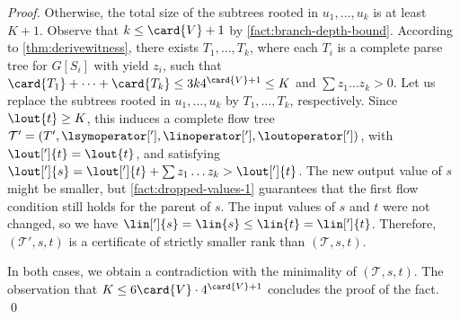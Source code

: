 \begin{proof}
  Otherwise,
  the total size of the subtrees rooted in $u_1, \ldots, u_k$ is
  at least $K + 1$.
  Observe that $k \leq \card{V} + 1$ by \cref{fact:branch-depth-bound}.
  According to \cref{thm:derivewitness},
  there exists $T_1, \ldots, T_k$,
  where each $T_i$ is a complete parse tree for $G[S_i]$ with
  yield $z_i$,
  such that $\card{T_1} + \cdots + \card{T_k} \leq 3 k 4^{\card{V}+1} \leq K$
  and $\sum z_1\ldots z_k>0$.
  Let us replace the subtrees rooted in $u_1, \ldots, u_k$
  by $T_1, \ldots, T_k$, respectively.
  Since $\lout{t} \geq K$,
  this induces a complete flow tree
  $\mathcal{T}' = (T', \lsymoperator['], \linoperator['], \loutoperator['])$,
  with $\lout[']{t} = \lout{t}$, and
  satisfying
  $\lout[']{s} = \lout[']{t} + \sum z_1\ldots z_k > \lout[']{t}$.
  The new output value of $s$ might be smaller,
  but \cref{fact:dropped-values-1} guarantees that the first flow condition
  still holds for the parent of $s$.
  The input values of $s$ and $t$ were not changed,
  so we have $\lin[']{s} = \lin{s} \leq \lin{t} = \lin[']{t}$.
  Therefore,
  $(\mathcal{T}', s, t)$ is a certificate
  of strictly smaller rank than $(\mathcal{T}, s, t)$.

  In both cases,
  we obtain a contradiction with the minimality of $(\mathcal{T}, s, t)$.
  The observation that $K \leq 6 \card{V} \cdot 4^{\card{V}+1}$
  concludes the proof of the fact.
  \qed
\end{proof}

